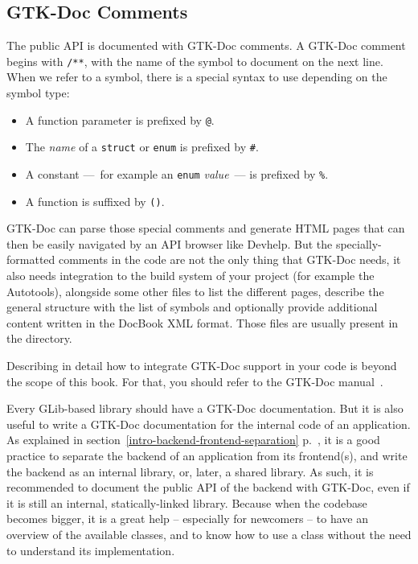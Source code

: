 \subsection{GTK-Doc Comments}
The public API is documented with GTK-Doc comments. A GTK-Doc comment begins with \lstinline{/**}, with the name of the symbol to document on the next line. When we refer to a symbol, there is a special syntax to use depending on the symbol type:
\begin{itemize}
  \item A function parameter is prefixed by \lstinline{@}.
  \item The \emph{name} of a \lstinline{struct} or \lstinline{enum} is prefixed by \lstinline{#}.
  \item A constant ---~for example an \lstinline{enum} \emph{value}~--- is prefixed by \lstinline{%}.
  \item A function is suffixed by \lstinline{()}.
\end{itemize}

GTK-Doc can parse those special comments and generate HTML pages that can then be easily navigated by an API browser like Devhelp. But the specially-formatted comments in the code are not the only thing that GTK-Doc needs, it also needs integration to the build system of your project (for example the Autotools), alongside some other files to list the different pages, describe the general structure with the list of symbols and optionally provide additional content written in the DocBook XML format. Those files are usually present in the  directory.

Describing in detail how to integrate GTK-Doc support in your code is beyond the scope of this book. For that, you should refer to the GTK-Doc manual~\cite{gtk-doc}.

Every GLib-based library should have a GTK-Doc documentation. But it is also useful to write a GTK-Doc documentation for the internal code of an application. As explained in section~\ref{intro-backend-frontend-separation} p.~\pageref{intro-backend-frontend-separation}, it is a good practice to separate the backend of an application from its frontend(s), and write the backend as an internal library, or, later, a shared library. As such, it is recommended to document the public API of the backend with GTK-Doc, even if it is still an internal, statically-linked library. Because when the codebase becomes bigger, it is a great help -- especially for newcomers -- to have an overview of the available classes, and to know how to use a class without the need to understand its implementation.

